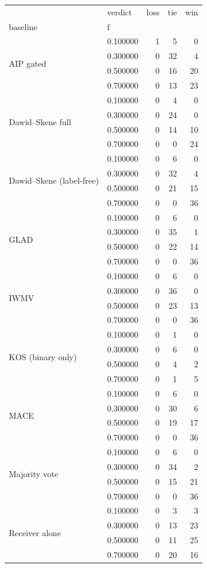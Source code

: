 \begin{tabular}{llrrr}
\toprule
 & verdict & loss & tie & win \\
baseline & f &  &  &  \\
\midrule
\multirow[t]{4}{*}{AIP gated} & 0.100000 & 1 & 5 & 0 \\
 & 0.300000 & 0 & 32 & 4 \\
 & 0.500000 & 0 & 16 & 20 \\
 & 0.700000 & 0 & 13 & 23 \\
\cline{1-5}
\multirow[t]{4}{*}{Dawid–Skene full} & 0.100000 & 0 & 4 & 0 \\
 & 0.300000 & 0 & 24 & 0 \\
 & 0.500000 & 0 & 14 & 10 \\
 & 0.700000 & 0 & 0 & 24 \\
\cline{1-5}
\multirow[t]{4}{*}{Dawid–Skene (label-free)} & 0.100000 & 0 & 6 & 0 \\
 & 0.300000 & 0 & 32 & 4 \\
 & 0.500000 & 0 & 21 & 15 \\
 & 0.700000 & 0 & 0 & 36 \\
\cline{1-5}
\multirow[t]{4}{*}{GLAD} & 0.100000 & 0 & 6 & 0 \\
 & 0.300000 & 0 & 35 & 1 \\
 & 0.500000 & 0 & 22 & 14 \\
 & 0.700000 & 0 & 0 & 36 \\
\cline{1-5}
\multirow[t]{4}{*}{IWMV} & 0.100000 & 0 & 6 & 0 \\
 & 0.300000 & 0 & 36 & 0 \\
 & 0.500000 & 0 & 23 & 13 \\
 & 0.700000 & 0 & 0 & 36 \\
\cline{1-5}
\multirow[t]{4}{*}{KOS (binary only)} & 0.100000 & 0 & 1 & 0 \\
 & 0.300000 & 0 & 6 & 0 \\
 & 0.500000 & 0 & 4 & 2 \\
 & 0.700000 & 0 & 1 & 5 \\
\cline{1-5}
\multirow[t]{4}{*}{MACE} & 0.100000 & 0 & 6 & 0 \\
 & 0.300000 & 0 & 30 & 6 \\
 & 0.500000 & 0 & 19 & 17 \\
 & 0.700000 & 0 & 0 & 36 \\
\cline{1-5}
\multirow[t]{4}{*}{Majority vote} & 0.100000 & 0 & 6 & 0 \\
 & 0.300000 & 0 & 34 & 2 \\
 & 0.500000 & 0 & 15 & 21 \\
 & 0.700000 & 0 & 0 & 36 \\
\cline{1-5}
\multirow[t]{4}{*}{Receiver alone} & 0.100000 & 0 & 3 & 3 \\
 & 0.300000 & 0 & 13 & 23 \\
 & 0.500000 & 0 & 11 & 25 \\
 & 0.700000 & 0 & 20 & 16 \\
\cline{1-5}
\bottomrule
\end{tabular}

